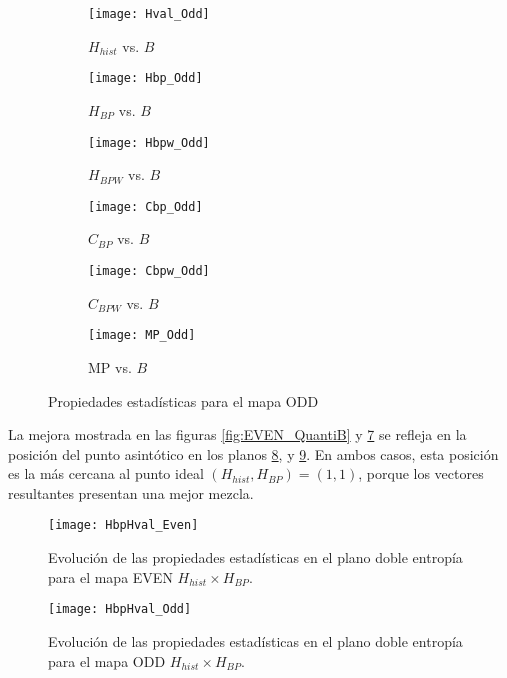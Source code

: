 %
\begin{figure}[htpb]
	\centering
	\begin{subfigure}[b]{0.49\textwidth}
		\texttt{[image: Hval\_Odd]}
		\caption{$H_{hist}$ vs. $B$}
		\label{fig:Hval_Odd}
	\end{subfigure}
	\begin{subfigure}[b]{0.49\textwidth}
		\texttt{[image: Hbp\_Odd]}
		\caption{$H_{BP}$ vs. $B$}
		\label{fig:Hbp_Odd}
	\end{subfigure}
	\begin{subfigure}[b]{0.49\textwidth}
		\texttt{[image: Hbpw\_Odd]}
		\caption{$H_{BPW}$ vs. $B$}
		\label{fig:Hbpw_Odd}
	\end{subfigure}
	\begin{subfigure}[b]{0.49\textwidth}
		\texttt{[image: Cbp\_Odd]}
		\caption{$C_{BP}$ vs. $B$}
		\label{fig:Cbp_Odd}
	\end{subfigure}
	\begin{subfigure}[b]{0.49\textwidth}
		\texttt{[image: Cbpw\_Odd]}
		\caption{$C_{BPW}$ vs. $B$}
		\label{fig:Cbpw_Odd}
	\end{subfigure}
	\begin{subfigure}[b]{0.49\textwidth}
		\texttt{[image: MP\_Odd]}
		\caption{MP vs. $B$}
		\label{fig:MP_Odd}
	\end{subfigure}
	\caption{Propiedades estadísticas para el mapa ODD}
	\label{fig:ODD_QuantiB}
\end{figure}

La mejora mostrada en las figuras \ref{fig:EVEN_QuantiB} y \ref{fig:ODD_QuantiB} se refleja en la posición del punto asintótico en los planos \ref{fig:EVEN_HH}, y \ref{fig:ODD_HH}.
En ambos casos, esta posición es la más cercana al punto ideal $(H_{hist}, H_{BP}) = (1, 1)$, porque los vectores resultantes presentan una mejor mezcla.
%
\begin{figure}[htpb]
	\centering
	\texttt{[image: HbpHval\_Even]}
	\caption{Evolución de las propiedades estadísticas en el plano doble entropía para el mapa EVEN $H_{hist} \times H_{BP}$.}
	\label{fig:EVEN_HH}
\end{figure}
%
\begin{figure}[htpb]
	\centering
	\texttt{[image: HbpHval\_Odd]}
	\caption{Evolución de las propiedades estadísticas en el plano doble entropía para el mapa ODD $H_{hist} \times H_{BP}$.}
	\label{fig:ODD_HH}
\end{figure}


